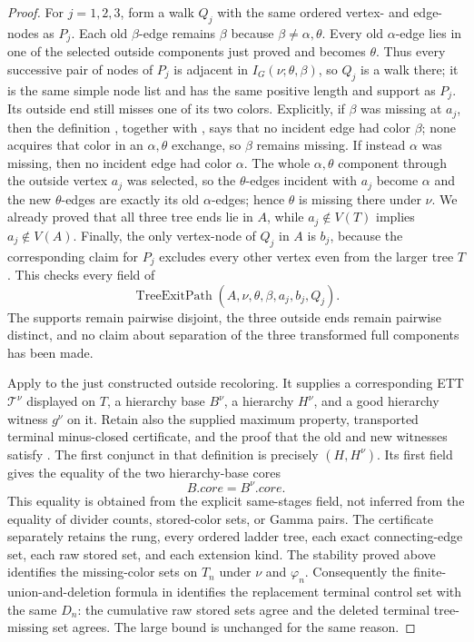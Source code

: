 \begin{proof}
For $j=1,2,3$, form a walk $Q_j$ with the same ordered vertex- and
edge-nodes as $P_j$.  Each old $\beta$-edge remains $\beta$ because
$\beta\ne\alpha,\theta$.  Every old $\alpha$-edge lies in one of the
selected outside components just proved and becomes $\theta$.  Thus
every successive pair of nodes of $P_j$ is adjacent in
$I_G(\nu;\theta,\beta)$, so $Q_j$ is a walk there; it is the same simple
node list and has the same positive length and support as $P_j$.
Its outside end still misses one of its two colors.  Explicitly, if
$\beta$ was missing at $a_j$, then the definition
, together with , says
that no incident edge had color $\beta$; none acquires that color in an
$\alpha,\theta$ exchange, so $\beta$ remains missing.  If instead
$\alpha$ was missing, then no incident edge had color $\alpha$.  The
whole $\alpha,\theta$ component through the outside vertex $a_j$ was
selected, so the $\theta$-edges incident with $a_j$ become $\alpha$ and
the new $\theta$-edges are exactly its old $\alpha$-edges; hence
$\theta$ is missing there under $\nu$.  We already proved that all three
tree ends lie in $A$, while $a_j\notin V(T)$ implies
$a_j\notin V(A)$.  Finally, the only vertex-node of $Q_j$ in $A$ is
$b_j$, because the corresponding claim for $P_j$ excludes every other
vertex even from the larger tree $T$.  This checks every field of
\[
       \operatorname{TreeExitPath}(A,\nu,\theta,\beta,a_j,b_j,Q_j).
       \tag{5}
\]
The supports remain pairwise disjoint, the three outside ends remain
pairwise distinct, and no claim about separation of the three
transformed full components has been made.

Apply  to the just constructed outside
recoloring.  It supplies a corresponding ETT $\mathcal T^\nu$ displayed
on $T$, a hierarchy base $B^\nu$, a hierarchy $H^\nu$, and a good
hierarchy witness $g^\nu$ on it.  Retain also the supplied maximum
property, transported terminal minus-closed certificate, and the proof
that the old and new witnesses satisfy .
The first conjunct in that definition is precisely
$(H,H^\nu)$.  Its first field gives the
equality of the two hierarchy-base cores
\[
                         B.\mathit{core}=B^\nu.\mathit{core}.   \tag{6}
\]
This equality is obtained from the explicit same-stages field, not inferred
from the equality of divider counts, stored-color sets, or Gamma pairs.
The  certificate separately
retains the rung, every ordered ladder tree, each exact connecting-edge
set, each raw stored set, and each extension kind.  The stability proved
above identifies the missing-color sets on $T_n$ under $\nu$ and
$\varphi_n$.  Consequently the finite-union-and-deletion formula in
 identifies the replacement terminal
control set with the same $D_n$: the cumulative raw stored sets agree and
the deleted terminal tree-missing set agrees.  The large bound is unchanged
for the same reason.


\end{proof}
